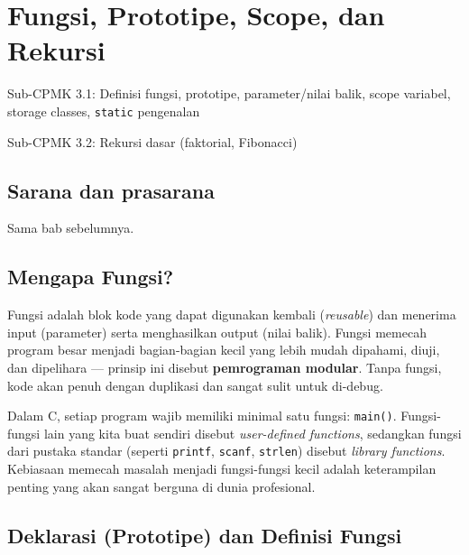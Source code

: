 \documentclass[../main.tex]{subfiles}
\begin{document}
\chapter{Fungsi, Prototipe, Scope, dan Rekursi}

\begin{subcpmk}
  \item Sub-CPMK 3.1: Definisi fungsi, prototipe, parameter/nilai balik, scope variabel, storage classes, \texttt{static} pengenalan
  \item Sub-CPMK 3.2: Rekursi dasar (faktorial, Fibonacci)
\end{subcpmk}


\section{Sarana dan prasarana}
Sama bab sebelumnya.

\section{Mengapa Fungsi?}

Fungsi adalah blok kode yang dapat digunakan kembali (\textit{reusable}) dan menerima input (parameter) serta menghasilkan output (nilai balik). Fungsi memecah program besar menjadi bagian-bagian kecil yang lebih mudah dipahami, diuji, dan dipelihara --- prinsip ini disebut \textbf{pemrograman modular}. Tanpa fungsi, kode akan penuh dengan duplikasi dan sangat sulit untuk di-debug.

Dalam C, setiap program wajib memiliki minimal satu fungsi: \texttt{main()}. Fungsi-fungsi lain yang kita buat sendiri disebut \textit{user-defined functions}, sedangkan fungsi dari pustaka standar (seperti \texttt{printf}, \texttt{scanf}, \texttt{strlen}) disebut \textit{library functions}. Kebiasaan memecah masalah menjadi fungsi-fungsi kecil adalah keterampilan penting yang akan sangat berguna di dunia profesional.

\section{Deklarasi (Prototipe) dan Definisi Fungsi}
\end{document}
